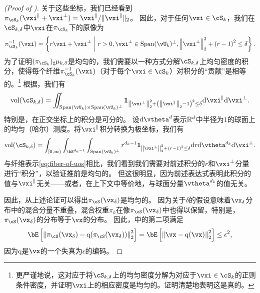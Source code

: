 \documentclass[../../book-main.tex]{subfiles}
\begin{document}
\begin{proof}[(Proof of )]
    关于这些坐标，我们已经看到$\pi_{\cS_k}(\vxi^\| + \vxi^\perp) = \vxi^\| / \norm{\vxi^{\|}}_2$。
    因此，对于任何$\vxi \in \cS_{k}$，我们在$\cS_{k, \delta}$中$\vxi$在$\pi_{\cS_k}$下的原像为
    \begin{equation}
        \pi_{\cS_k}^{-1}(\vxi) = \set*{
            r\vxi + \vxi^\perp 
            \given
            r > 0,
            \vxi^{\perp} \in \Span(\vU_k)^\perp,
            \norm*{\vxi^{\perp}}_2^2
            + \left( r - 1 \right)^2
            \leq
            \delta
        }.
        \label{eq:fiber-of-uos}
    \end{equation}
    为了证明$(\pi_{\cS_k})_{\sharp} \mu_{k, \delta}$是均匀的，我们需要以一种方式分解$\cS_{k, \delta}$上均匀密度的积分，使得每个纤维$\pi_{\cS_k}^{-1}(\vxi)$（对于每个$\vxi \in \cS_k$）对积分的“贡献”是相等的。\footnote{更严谨地说，这对应于将$\cS_{k, \delta}$上的均匀密度分解为对应于$\vxi \in \cS_{k}$的正则条件密度，并证明$\vxi$上的相应密度是均匀的。证明清楚地表明这是真的。}
    根据，我们有
    \begin{equation}
        \volume(\cS_{k, \delta})
        = \iint_{\Span(\vU_k) \times \Span(\vU_k)^\perp} \mathbf{1}_{
            \norm*{\vxi^{\perp}}_2^2
            + \left( \norm*{\vxi^{\|}}_2 - 1 \right)^2
            \leq
            \delta
        }
        \odif \vxi^{\|} \odif \vxi^{\perp}.
    \end{equation}
    特别是，在正交坐标上的积分是可分的。
    设$\odif \vtheta^{d}$表示$\mathbb{R}^d$中半径为$1$的球面上的均匀（哈尔）测度。将$\vxi^{\|}$积分转换为极坐标，我们有
    \begin{equation}
        \volume(\cS_{k, \delta})
        = \int_{[0, \infty)} \int_{\bS^{d_k-1}} \int_{\Span(\vU_k)^\perp} 
        r^{d_k-1}
        \mathbf{1}_{
            \norm*{\vxi^{\perp}}_2^2
            + \left( r - 1 \right)^2
            \leq
            \delta
        }
        \odif r \odif \vtheta^{d_k} \odif \vxi^{\perp}.
    \end{equation}
    与纤维表示\eqref{eq:fiber-of-uos}相比，我们看到我们需要对前述积分的$r$和$\vxi^\perp$分量进行“积分”，以验证推前是均匀的。
    但这很明显，因为前述表达式表明此积分的值与$\vxi^\|$无关——或者，在上下文中等价地，与球面分量$\vtheta^{d_k}$的值无关。

    因此，从上述论证可以得出$\pi_{\cS}(\vx_{\delta})$是均匀的。
    因为关于$\delta$的假设意味着$\vx_{\delta}$分布中的混合分量不重叠，混合权重$\pi_k$在像$\pi_{\cS}(\vx_{\delta})$中也得以保留，特别是，$\pi_{\cS}(\vx_{\delta})$的分布等于$\vx$的分布。
    因此，中的第二项满足
    \begin{equation}
        \bE\left[ \norm*{ \pi_{\cS}(\vx_{\delta}) - \mathrm{q}(\pi_{\cS}(\vx_{\delta})) }_2^2 \right]
        =
        \bE\left[ \norm*{ \vx - \mathrm{q}(\vx) }_2^2 \right]
        \leq
        \epsilon^2,
    \end{equation}
    因为$\mathrm{q}$是$\vx$的一个失真为$\epsilon$的编码。


\end{proof}
\end{document}
